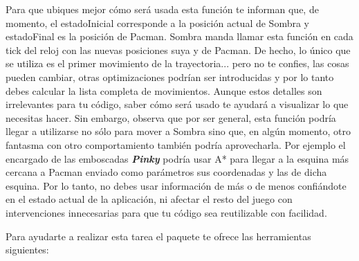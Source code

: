 Para que ubiques mejor cómo será usada esta función te informan que, de momento, el estadoInicial corresponde a la posición actual de Sombra y estadoFinal es la posición de Pacman.  Sombra manda llamar esta función en cada tick del reloj con las nuevas posiciones suya y de Pacman.  De hecho, lo único que se utiliza es el primer movimiento de la trayectoria... pero no te confies, las cosas pueden cambiar, otras optimizaciones podrían ser introducidas y por lo tanto debes calcular la lista completa de movimientos.  Aunque estos detalles son irrelevantes para tu código, saber cómo será usado te ayudará a visualizar lo que necesitas hacer.  Sin embargo, observa que por ser general, esta función podría llegar a utilizarse no sólo para mover a Sombra sino que, en algún momento, otro fantasma con otro comportamiento también podría aprovecharla.  Por ejemplo el encargado de las emboscadas \textbf{\textit{Pinky}} podría usar A* para llegar a la esquina más cercana a Pacman enviado como parámetros sus coordenadas y las de dicha esquina.  Por lo tanto, no debes usar información de más o de menos confiándote en el estado actual de la aplicación, ni afectar el resto del juego con intervenciones innecesarias para que tu código sea reutilizable con facilidad.

Para ayudarte a realizar esta tarea el paquete te ofrece las herramientas siguientes:

